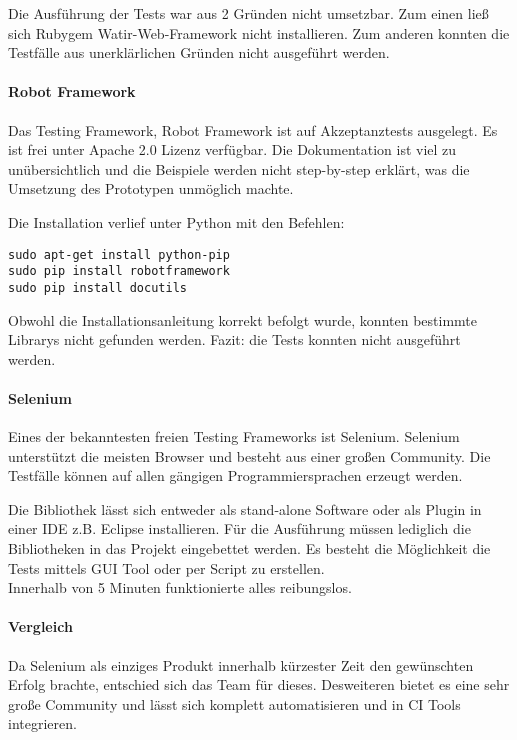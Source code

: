 Die Ausführung der Tests war aus 2 Gründen nicht umsetzbar. Zum einen ließ sich Rubygem Watir-Web-Framework nicht installieren. Zum anderen konnten die Testfälle aus unerklärlichen Gründen nicht ausgeführt werden.

\paragraph{Robot Framework}
Das Testing Framework, Robot Framework ist auf Akzeptanztests ausgelegt. Es ist frei unter Apache 2.0 Lizenz verfügbar. Die Dokumentation ist viel zu unübersichtlich und die Beispiele werden nicht step-by-step erklärt, was die Umsetzung des Prototypen unmöglich machte. \cite{ROBOTFRAMEWORK}

Die Installation verlief unter Python mit den Befehlen:
\begin{lstlisting}[caption={Installation von Robot Framework \cite{ROBOTFRAMEWORKINSTALL}}]
sudo apt-get install python-pip
sudo pip install robotframework
sudo pip install docutils
\end{lstlisting}

Obwohl die Installationsanleitung korrekt befolgt wurde, konnten bestimmte Librarys nicht gefunden werden. Fazit: die Tests konnten nicht ausgeführt werden. 
\paragraph{Selenium}
Eines der bekanntesten freien Testing Frameworks ist Selenium. Selenium unterstützt die meisten Browser und besteht aus einer großen Community. Die Testfälle können auf allen gängigen Programmiersprachen erzeugt werden.

Die Bibliothek lässt sich entweder als stand-alone Software oder als Plugin in einer IDE z.B. Eclipse installieren. Für die Ausführung müssen lediglich die Bibliotheken in das Projekt eingebettet werden. Es besteht die Möglichkeit die Tests mittels GUI Tool oder per Script zu erstellen.\\
Innerhalb von 5 Minuten funktionierte alles reibungslos.

\paragraph{Vergleich}
Da Selenium als einziges Produkt innerhalb kürzester Zeit den gewünschten Erfolg brachte, entschied sich das Team für dieses. Desweiteren bietet es eine sehr große Community und lässt sich komplett automatisieren und in CI Tools integrieren.
